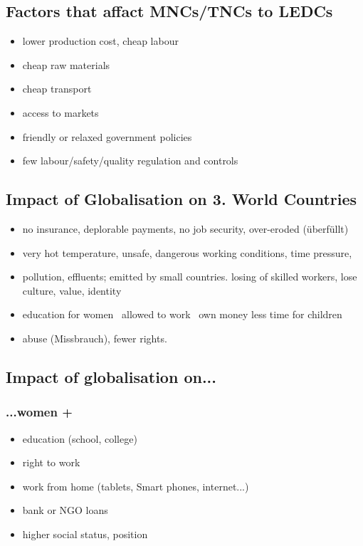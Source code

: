 \documentclass[a5paper,12pt,twoside,titlepage]{scrartcl}
\begin{document}
\subsection{Factors that affact MNCs/TNCs to LEDCs}
\begin{itemize}
	\item lower production cost, cheap labour
	\item cheap raw materials
	\item cheap transport
	\item access to markets
	\item friendly or relaxed government policies
	\item few labour/safety/quality regulation and controls
\end{itemize}
\subsection{Impact of Globalisation on 3. World Countries}
\begin{itemize}
	\item no insurance, deplorable payments, no job security, over-eroded (überfüllt) 
	\item very hot temperature, unsafe, dangerous working conditions, time pressure, 
	\item \textrightarrow pollution, effluents; emitted by small countries. losing of skilled workers, lose culture, value, identity
	\item education for women \textrightarrow\ allowed to work \textrightarrow\ own money less time for children
	\item abuse (Missbrauch), fewer rights.
\end{itemize}

\subsection{Impact of globalisation on...}
\subsubsection{...women +}
	\begin{itemize}
		\item education (school, college)
		\item right to work
		\item work from home (tablets, Smart phones, internet...) 
		\item bank or NGO loans
		\item higher social status, position
	\end{itemize}
\end{document}
